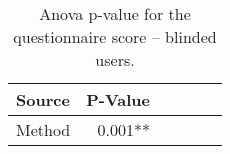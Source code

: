 
\begin{table}[!htb]
\centering
\caption{Anova p-value for the questionnaire score -- blinded users.}
\label{tab:blocanova_questionnaire_blind}
\begin{tabular}{lrrrrr}
\toprule
Source & P-Value \\
\midrule
Method & 0.001** \\
\bottomrule
\end{tabular}
\end{table}

